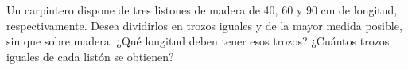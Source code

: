\documentclass[addpoints,spanish, 12pt,a4paper]{exam}
\renewcommand*\half{.5}
\begin{document}
\begin{questions}
\begin{multicols}{2}
    
    \end{multicols}

\vspace{60pt}
    \question[2] Un carpintero dispone de tres listones de madera de 40, 60 y 90 cm de longitud, respectivamente. Desea dividirlos en trozos iguales y de la mayor medida posible, sin que sobre madera. ¿Qué longitud deben tener esos trozos? ¿Cuántos trozos iguales de cada listón se obtienen?
\vspace{80pt}

    
    
    


\end{questions}
\end{document}
